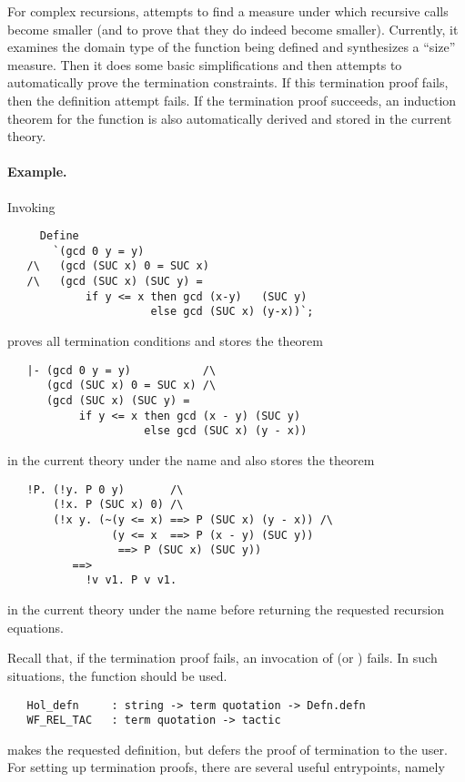 For complex recursions,  attempts to find a measure under
which recursive calls become smaller (and to prove that they do indeed
become smaller). Currently, it examines the domain type of the
function being defined and synthesizes a ``size'' measure.  Then it
does some basic simplifications and then attempts to automatically
prove the termination constraints.  If this termination proof fails,
then the definition attempt fails. If the termination proof succeeds,
an induction theorem for the function is also automatically derived
and stored in the current theory.

\paragraph{Example.} Invoking
\begin{verbatim}
     Define
       `(gcd 0 y = y)
   /\   (gcd (SUC x) 0 = SUC x)
   /\   (gcd (SUC x) (SUC y) =
            if y <= x then gcd (x-y)   (SUC y)
                      else gcd (SUC x) (y-x))`;
\end{verbatim}
proves all termination conditions and stores the theorem
\begin{verbatim}
   |- (gcd 0 y = y)           /\
      (gcd (SUC x) 0 = SUC x) /\
      (gcd (SUC x) (SUC y) =
           if y <= x then gcd (x - y) (SUC y)
                     else gcd (SUC x) (y - x))
\end{verbatim}
in the current theory under the name  and also stores
the theorem
\begin{verbatim}
   !P. (!y. P 0 y)       /\
       (!x. P (SUC x) 0) /\
       (!x y. (~(y <= x) ==> P (SUC x) (y - x)) /\
                (y <= x  ==> P (x - y) (SUC y))
                 ==> P (SUC x) (SUC y))
          ==>
            !v v1. P v v1.
\end{verbatim}
in the current theory under the name  before
returning the requested recursion equations.

Recall that, if the termination proof fails, an invocation of
\ml{Define}  (or ) fails. In such situations, the \ML{}
function \ml{Hol\_defn} should be used.
%

\begin{verbatim}
   Hol_defn     : string -> term quotation -> Defn.defn
   WF_REL_TAC   : term quotation -> tactic
\end{verbatim}

\ml{Hol\_defn} makes the requested definition, but defers the proof of
termination to the user. For setting up termination proofs, there are
several useful entrypoints, namely

